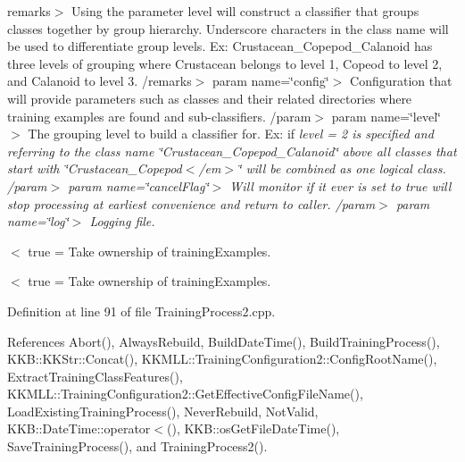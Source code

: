 remarks$>$ Using the parameter level will construct a classifier that groups classes together by group hierarchy. Underscore characters in the class name will be used to differentiate group levels. Ex\+: Crustacean\+\_\+\+Copepod\+\_\+\+Calanoid has three levels of grouping where Crustacean belongs to level 1, Copeod to level 2, and Calanoid to level 3. /remarks$>$ param name=\char`\"{}config\char`\"{}$>$ Configuration that will provide parameters such as classes and their related directories where training examples are found and sub-\/classifiers. /param$>$ param name=\char`\"{}level\char`\"{}$>$ The grouping level to build a classifier for. Ex\+: if {\itshape level = 2 is specified and referring to the class name \char`\"{}\+Crustacean\+\_\+\+Copepod\+\_\+\+Calanoid\char`\"{} above all classes that start with \char`\"{}\+Crustacean\+\_\+\+Copepod$<$/em$>$\char`\"{} will be combined as one logical class. /param$>$ param name=\char`\"{}cancel\+Flag\char`\"{}$>$ Will monitor if it ever is set to true will stop processing at earliest convenience and return to caller. /param$>$ param name=\char`\"{}log\char`\"{}$>$ Logging file.}

{\itshape  }$<$ true = Take ownership of \textquotesingle{}training\+Examples\textquotesingle{}.

$<$ true = Take ownership of \textquotesingle{}training\+Examples\textquotesingle{}. 

Definition at line 91 of file Training\+Process2.\+cpp.



References Abort(), Always\+Rebuild, Build\+Date\+Time(), Build\+Training\+Process(), K\+K\+B\+::\+K\+K\+Str\+::\+Concat(), K\+K\+M\+L\+L\+::\+Training\+Configuration2\+::\+Config\+Root\+Name(), Extract\+Training\+Class\+Features(), K\+K\+M\+L\+L\+::\+Training\+Configuration2\+::\+Get\+Effective\+Config\+File\+Name(), Load\+Existing\+Training\+Process(), Never\+Rebuild, Not\+Valid, K\+K\+B\+::\+Date\+Time\+::operator$<$(), K\+K\+B\+::os\+Get\+File\+Date\+Time(), Save\+Training\+Process(), and Training\+Process2().


